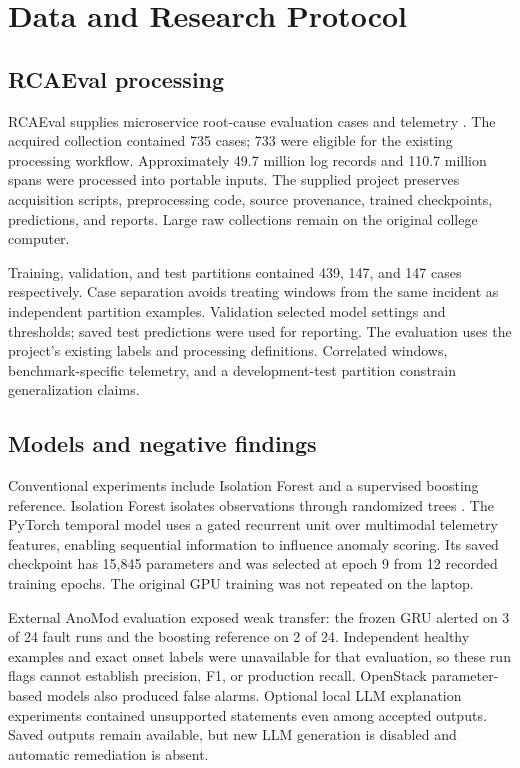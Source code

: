 \documentclass[conference]{IEEEtran}
\begin{document}
\section{Data and Research Protocol}
\subsection{RCAEval processing}
RCAEval supplies microservice root-cause evaluation cases and telemetry \cite{rcaeval}. The acquired collection contained 735 cases; 733 were eligible for the existing processing workflow. Approximately 49.7 million log records and 110.7 million spans were processed into portable inputs. The supplied project preserves acquisition scripts, preprocessing code, source provenance, trained checkpoints, predictions, and reports. Large raw collections remain on the original college computer.

Training, validation, and test partitions contained 439, 147, and 147 cases respectively. Case separation avoids treating windows from the same incident as independent partition examples. Validation selected model settings and thresholds; saved test predictions were used for reporting. The evaluation uses the project's existing labels and processing definitions. Correlated windows, benchmark-specific telemetry, and a development-test partition constrain generalization claims.

\subsection{Models and negative findings}
Conventional experiments include Isolation Forest and a supervised boosting reference. Isolation Forest isolates observations through randomized trees \cite{if}. The PyTorch temporal model uses a gated recurrent unit over multimodal telemetry features, enabling sequential information to influence anomaly scoring. Its saved checkpoint has 15,845 parameters and was selected at epoch 9 from 12 recorded training epochs. The original GPU training was not repeated on the laptop.

External AnoMod evaluation exposed weak transfer: the frozen GRU alerted on 3 of 24 fault runs and the boosting reference on 2 of 24. Independent healthy examples and exact onset labels were unavailable for that evaluation, so these run flags cannot establish precision, F1, or production recall. OpenStack parameter-based models also produced false alarms. Optional local LLM explanation experiments contained unsupported statements even among accepted outputs. Saved outputs remain available, but new LLM generation is disabled and automatic remediation is absent.
\end{document}
